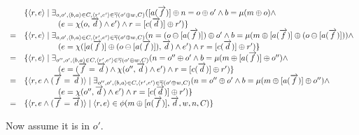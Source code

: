 \documentclass[a4paper,twoside]{article}
\def\vec#1{\overrightarrow{#1}}		%
\def\mset#1{[#1]}
\def\tup#1{\langle #1\rangle}
\begin{document}
\begin{center}$\begin{array}{ll}
 & \{\tup{r,e}\;|\;\exists_{o,o',\langle b,a\rangle\in C,\tup{r',e'}\in\overline{\gamma}(o'\oplus w,C)}(\mset{a(\vec{f})}\oplus n=o\oplus o'\land b=\mu(m \oplus o)\land\\&\hspace{15mm}(e=\chi(o,\vec{d})\land e') \land r=\mset{c(\vec{d})}\oplus r')\} \\
= & \{\tup{r,e}\;|\;\exists_{o,o',\langle b,a\rangle\in C,\tup{r',e'}\in\overline{\gamma}(o'\oplus w,C)}(n=(o\ominus \mset{a(\vec{f})})\oplus o'\land b=\mu(m \oplus\mset{a(\vec{f})}\oplus (o\ominus \mset{a(\vec{f})}))\land\\&\hspace{15mm}(e=\chi(\mset{a(\vec{f})}\oplus(o\ominus\mset{a(\vec{f})}),\vec{d})\land e') \land r=\mset{c(\vec{d})}\oplus r')\} \\
= & \{\tup{r,e}\;|\;\exists_{o'',o',\langle b,a\rangle\in C,\tup{r',e'}\in\overline{\gamma}(o'\oplus w,C)}(n=o''\oplus o'\land b=\mu(m \oplus\mset{a(\vec{f})}\oplus o'')\land\\&\hspace{15mm}(e=(\vec{f}=\vec{d})\land\chi(o'',\vec{d})\land e') \land r=\mset{c(\vec{d})}\oplus r')\} \\
= & \{\tup{r,e\land(\vec{f}=\vec{d})}\;|\;\exists_{o'',o',\langle b,a\rangle\in C,\tup{r',e'}\in\overline{\gamma}(o'\oplus w,C)}(n=o''\oplus o'\land b=\mu(m \oplus\mset{a(\vec{f})}\oplus o'')\land\\&\hspace{15mm}(e=\chi(o'',\vec{d})\land e') \land r=\mset{c(\vec{d})}\oplus r')\} \\
= & \{\tup{r,e\land(\vec{f}=\vec{d})}\;|\;\tup{r,e}\in\phi(m\oplus\mset{a(\vec{f})},\vec{d},w,n,C)\} \\
\end{array}$\end{center}

\noindent Now assume it is in $o'$.
\end{document}
